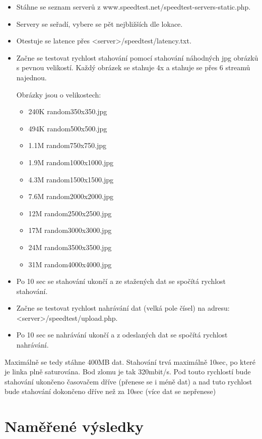 \documentclass[12pt,a4paper]{article}
\begin{document}
\begin{itemize}
\item Stáhne se seznam serverů z www.speedtest.net/speedtest-servers-static.php.
\item Servery se seřadí, vybere se pět nejbližších dle lokace.
\item Otestuje se latence přes <server>/speedtest/latency.txt.
\item Začne se testovat rychlost stahování pomocí stahování náhodných jpg obrázků s pevnou velikostí. Každý obrázek se stahuje 4x a stahuje se přes 6 streamů najednou.

Obrázky jsou o velikostech:


\begin{itemize}
\item 240K random350x350.jpg
\item 494K random500x500.jpg
\item 1.1M random750x750.jpg
\item 1.9M random1000x1000.jpg
\item 4.3M random1500x1500.jpg
\item 7.6M random2000x2000.jpg
\item  12M random2500x2500.jpg
\item  17M random3000x3000.jpg
\item  24M random3500x3500.jpg
\item  31M random4000x4000.jpg
\end{itemize}

\item Po 10 sec se stahování ukončí a ze stažených dat se spočítá rychlost stahování.
\item Začne se testovat rychlost nahrávání dat (velká pole čísel) na adresu: <server>/speedtest/upload.php.
\item Po 10 sec se nahrávání ukončí a z odeslaných dat se spočítá rychlost nahrávání.
\end{itemize}

Maximálně se tedy stáhne 400MB dat. Stahování trvá maximálně 10sec, po které je linka plně saturována. Bod zlomu je tak 320mbit/s. Pod touto rychlostí bude stahování ukončeno časovačem dříve (přenese se i méně dat) a nad tuto rychlost bude stahování dokončeno dříve než za 10sec (více dat se nepřenese)


\section{Naměřené výsledky}
\end{document}
